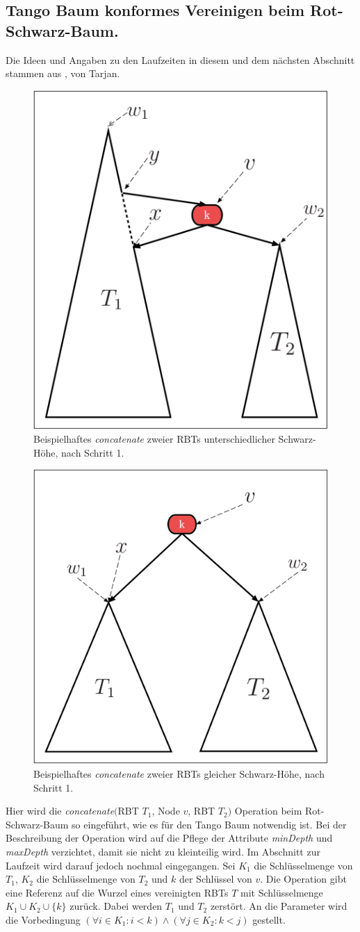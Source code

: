 \documentclass[a4paper,12pt]{article}
\begin{document}
\subsection{Tango Baum konformes Vereinigen beim Rot-Schwarz-Baum.} \label{vereinigen}
Die Ideen und Angaben zu den Laufzeiten in diesem und dem nächsten Abschnitt stammen aus \cite{conSplit}, von Tarjan.
\begin{figure}[H]
	\centering
	\includegraphics[height= 0.6\textwidth]{Medien/RotSchwarzBaum/vereinigen}
	\caption{Beispielhaftes \textit{concatenate} zweier RBTs unterschiedlicher Schwarz-Höhe, nach Schritt 1. }
	\label{fig:vereinigen}
\end{figure}
\begin{figure}[H]
	\centering
	\includegraphics[height= 0.6\textwidth]{Medien/RotSchwarzBaum/vereinigen2}
	\caption{Beispielhaftes \textit{concatenate} zweier RBTs gleicher Schwarz-Höhe, nach Schritt 1. }
	\label{fig:vereinigen2}
\end{figure}
\noindent Hier wird die \textit{concatenate}$($RBT $T_1$, Node $v$, RBT $T_2)$ Operation beim Rot-Schwarz-Baum so eingeführt, wie es für den Tango Baum notwendig ist. Bei der Beschreibung der Operation wird auf die Pflege der Attribute  \textit{minDepth} und \textit{maxDepth} verzichtet, damit sie nicht zu kleinteilig wird. Im Abschnitt zur Laufzeit wird darauf jedoch nochmal eingegangen. Sei $K_1$ die Schlüsselmenge von $T_1$, $K_2$ die Schlüsselmenge von $T_2$ und $k$ der Schlüssel von $v$. Die Operation gibt eine Referenz auf die Wurzel eines vereinigten RBTs $T$ mit Schlüsselmenge $K_1 \cup K_2 \cup \{k\} $ zurück. Dabei werden $T_1$ und $T_2$ zerstört. An die Parameter wird die Vorbedingung $(\forall i \in K_1: i < k ) \land (\forall j \in K_2: k < j )$ gestellt.\\
\end{document}
